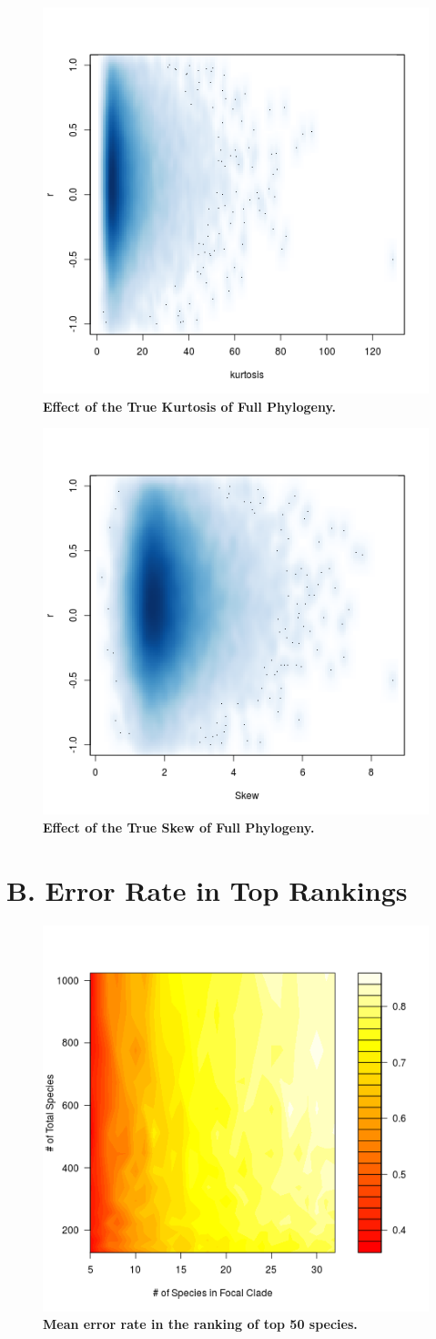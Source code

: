 \documentclass[12pt,english]{article}
\begin{document}
\begin{figure}[!ht]
  \center
  \includegraphics[width=.5\textwidth]{originalKurtosis.png}
  \caption{\textbf{Effect of the True Kurtosis of Full Phylogeny.}}
\end{figure}

\begin{figure}[!ht]
  \center
  \includegraphics[width=.5\textwidth]{originalSkew.png}
  \caption{\textbf{Effect of the True Skew of Full Phylogeny.}}
\end{figure}

\clearpage
\clearpage
\section*{B. Error Rate in Top Rankings}

\begin{figure}[!ht]
  \center
  \includegraphics[width=.5\textwidth]{errorRate50.png}
  \caption{\textbf{Mean error rate in the ranking of top 50 species.}}
\end{figure}
\end{document}

